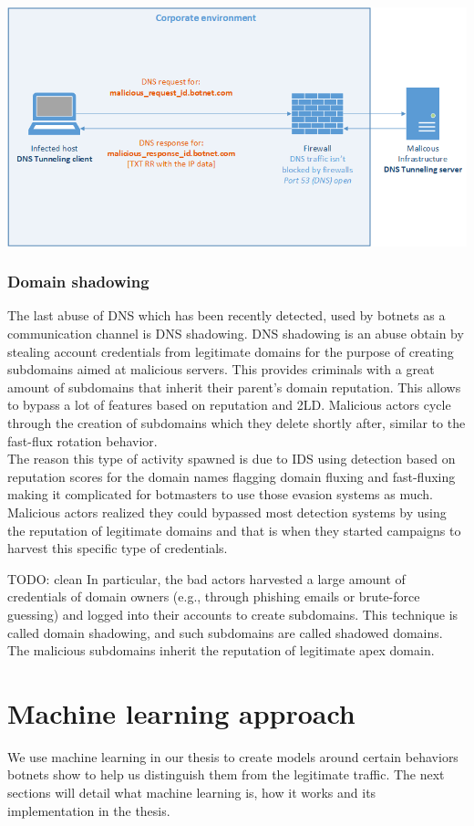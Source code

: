 \includegraphics[scale=.8]{img/pers_tunn.png}


\subsubsection{Domain shadowing}
The last abuse of DNS which has been recently detected, used by botnets as a communication channel is DNS shadowing. DNS shadowing is an abuse obtain by stealing account credentials from legitimate domains for the purpose of creating subdomains aimed at malicious servers. This provides criminals with a great amount of subdomains that inherit their parent's domain reputation. This allows to bypass a lot of features based on reputation and 2LD.
Malicious actors cycle through the creation of subdomains which they delete shortly after, similar to the fast-flux rotation behavior.
\\
The reason this type of activity spawned is due to IDS using detection based on reputation scores for the domain names flagging domain fluxing and fast-fluxing making it complicated for botmasters to use those evasion systems as much. Malicious actors realized they could bypassed most detection systems by using the reputation of legitimate domains and that is when they started campaigns to harvest this specific type of credentials.

\cite{review2}\cite{detection8}
TODO: clean 
In particular, the bad actors harvested a large amount of credentials of domain owners (e.g., through phishing emails or brute-force guessing) and logged into their accounts to create subdomains. This technique is called domain shadowing, and such subdomains are called shadowed domains. The malicious subdomains inherit the reputation of legitimate apex domain.
\cite{shadowing2}
\cite{shadowing3}
\cite{shadowing4}
\cite{shadowing5}

\section{Machine learning approach}
We use machine learning in our thesis to create models around certain behaviors botnets show to help us distinguish them from the legitimate traffic. The next sections will detail what machine learning is, how it works and its implementation in the thesis.

